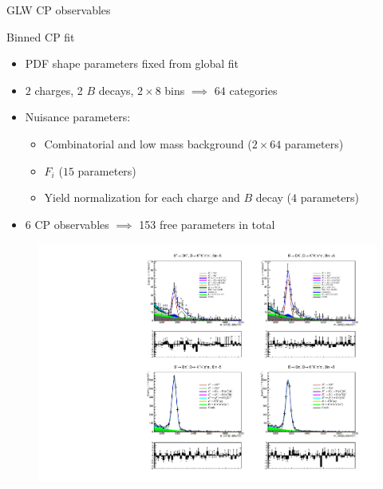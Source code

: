 \documentclass{beamer}
\begin{document}
\begin{frame}{GLW CP observables}
\begin{figure}
\begin{subfigure}{0.45\textwidth}
    \end{subfigure}
  \end{figure}
\end{frame}

\begin{frame}{Binned CP fit}
  \begin{itemize}
    \setlength\itemsep{0.0em}
    \item{PDF shape parameters fixed from global fit}
    \item{$2$ charges, 2 $B$ decays, $2\times 8$ bins $\implies$ $64$ categories}
    \item{Nuisance parameters:}
    \begin{itemize}
      \item{Combinatorial and low mass background ($2\times 64$ parameters)}
      \item{$F_i$ ($15$ parameters)}
      \item{Yield normalization for each charge and $B$ decay ($4$ parameters)}
    \end{itemize}
    \item{$6$ CP observables $\implies$ 153 free parameters in total}
  \end{itemize}
  \begin{figure}
    \includegraphics[width = 1.0\textwidth, clip = true, trim = {0 13cm 0 0}]{Plots/d2kkpipi_fiveL_binm5.pdf}
  \end{figure}
\end{frame}
\end{document}
